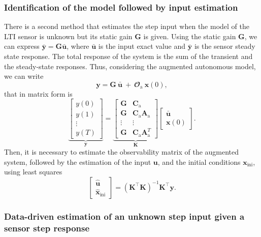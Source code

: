 \subsubsection{Identification of the model followed by input estimation}

There is a second method that estimates the step input when the model of the LTI sensor is unknown but its static gain $\mathbf{G}$ is given.
Using the static gain $\mathbf{G}$, we can express $\bar{\mathbf{y}} = \mathbf{G} \bar{\mathbf{u}}$, where $\bar{\mathbf{u}}$ is the input exact value and $\bar{\mathbf{y}}$ is the sensor steady state response.
The total response of the system is the sum of the transient and the steady-state responses.
Thus, considering the augmented autonomous model, we can write
\[ \mathbf{y} = \mathbf{G} \ \bar{\mathbf{u}} \ + \ \mathbfcal{O}_\text{a} \ \mathbf{x}(0) , \]
that in matrix form is
\[ \underbrace{ \begin{bmatrix}y(0) \\ y(1) \\ \vdots \\ y(T) \end{bmatrix}}_{\mathbf{y}} = \underbrace{ \begin{bmatrix} \mathbf{G} & \mathbf{C}_\text{a} \\ \mathbf{G} & \mathbf{C}_\text{a} \mathbf{A}_\text{a} \\ \vdots & \vdots \\ \mathbf{G} & \mathbf{C}_\text{a} \mathbf{A}_\text{a}^T \end{bmatrix}}_{\mathbf{K}} \begin{bmatrix} \bar{\mathbf{u}} \\ \mathbf{x}(0) \end{bmatrix} .\]
Then, it is necessary to estimate the observability matrix of the augmented system, followed by the estimation of the input  $\mathbf{u}$, and the initial conditions $\mathbf{x}_{\text{ini}}$, using least squares
\[ \begin{bmatrix} \widehat{\mathbf{u}} \\ \widehat{\mathbf{x}}_{\text{ini}} \end{bmatrix} = \left( \mathbf{K}^\top \mathbf{K} \right)^{-1} \mathbf{K}^\top \mathbf{y}. \]


\subsubsection{Data-driven estimation of an unknown step input given a sensor step response}

